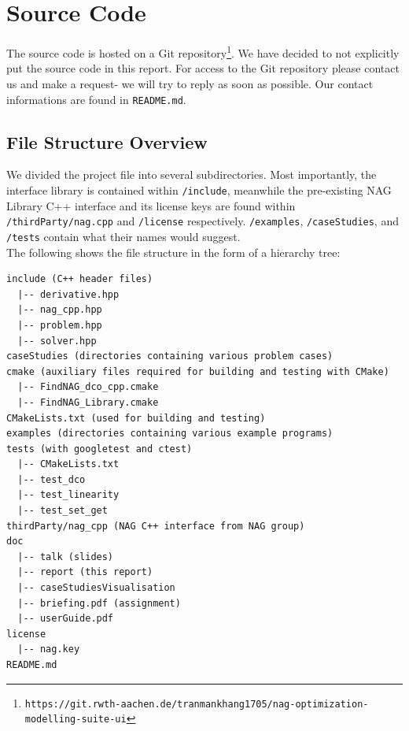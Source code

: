\documentclass{book}
\begin{document}
\section{Source Code}
The source code is hosted on a Git repository\footnote{\tt https://git.rwth-aachen.de/tranmankhang1705/nag-optimization-modelling-suite-ui}. We have decided to not explicitly put the source code in this report. For access to the Git repository please contact us and make a request- we will try to reply as soon as possible. Our contact informations are found in \texttt{README.md}.
\subsection{File Structure Overview}
We divided the project file into several subdirectories. Most importantly, the interface library is contained within \texttt{/include}, meanwhile the pre-existing NAG Library C++ interface and its license keys are found within \texttt{/thirdParty/nag.cpp} and \texttt{/license} respectively. \texttt{/examples}, \texttt{/caseStudies}, and \texttt{/tests} contain what their names would suggest. \\
\newline
The following shows the file structure in the form of a hierarchy tree:
\begin{lstlisting}[numbers=none]
include (C++ header files)
  |-- derivative.hpp
  |-- nag_cpp.hpp
  |-- problem.hpp
  |-- solver.hpp
caseStudies (directories containing various problem cases)
cmake (auxiliary files required for building and testing with CMake)
  |-- FindNAG_dco_cpp.cmake
  |-- FindNAG_Library.cmake
CMakeLists.txt (used for building and testing)
examples (directories containing various example programs)
tests (with googletest and ctest)
  |-- CMakeLists.txt
  |-- test_dco
  |-- test_linearity
  |-- test_set_get
thirdParty/nag_cpp (NAG C++ interface from NAG group)
doc
  |-- talk (slides)
  |-- report (this report)
  |-- caseStudiesVisualisation
  |-- briefing.pdf (assignment)
  |-- userGuide.pdf
license
  |-- nag.key
README.md
\end{lstlisting}
\end{document}
